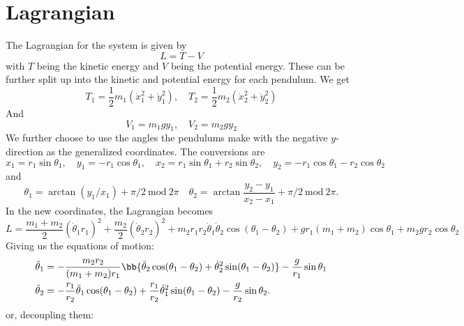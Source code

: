 \documentclass[a4paper,11pt]{article}
\begin{document}
	\section{Lagrangian}
	The Lagrangian for the system is given by
	\begin{equation}\label{key}
		L = T - V
	\end{equation}
	with $ T $ being the kinetic energy and $ V $ being the potential energy. These can be further split up into the kinetic and potential energy for each pendulum. We get
	\begin{equation}\label{key}
		T_1 = \frac{1}{2} m_1 (\dot{x}_1^2 + \dot{y}_1^2), \quad T_2 = \frac{1}{2} m_2 (\dot{x}_2^2 + \dot{y}_2^2)
	\end{equation}
	And
	\begin{equation}\label{key}
		V_1 = m_1 g y_1, \quad V_2 = m_2 g y_2
	\end{equation}
	We further choose to use the angles the pendulums make with the negative $ y $-direction as the generalized coordinates. The conversions are
	\begin{equation}\label{key}
		x_1 = r_1 \sin \theta_1, \quad y_1 = -r_1 \cos \theta_1, \quad x_2 = r_1 \sin \theta_1 + r_2 \sin \theta_2, \quad y_2 = -r_1 \cos \theta_1 - r_2 \cos \theta_2
	\end{equation}
	and
	\begin{equation}\label{key}
		\theta_1 = \arctan(y_1/x_1) + \pi/2\ \text{mod}\ 2\pi\quad  \theta_2 = \arctan\frac{y_2-y_1}{x_2-x_1} + \pi/2 \ \text{mod}\ 2\pi.
	\end{equation}
	In the new coordinates, the Lagrangian becomes
	\begin{equation}\label{key}
		L = \frac{m_1+m_2}{2}(\dot{\theta}_1 r_1)^2 + \frac{m_2}{2} (\dot{\theta}_2 r_2)^2 + m_2 r_1r_2\dot{\theta}_1\dot{\theta}_2 \cos(\theta_1-\theta_2) + gr_1(m_1+m_2) \cos\theta_1 + m_2gr_2 \cos\theta_2
	\end{equation}
	Giving us the equations of motion:
	\begin{align}
		\ddot{\theta}_1 &= -\frac{m_2 r_2}{(m_1+m_2)r_1} \bb{\ddot{\theta}_2 \cos(\theta_1-\theta_2) + \dot{\theta}_2^2 \sin(\theta_1-\theta_2)} - \frac{g}{r_1} \sin\theta_1\\
		\ddot{\theta}_2 &= -\frac{r_1}{r_2} \ddot{\theta}_1 \cos(\theta_1-\theta_2) + \frac{r_1}{r_2} \dot{\theta}_1^2 \sin(\theta_1-\theta_2) - \frac{g}{r_2} \sin\theta_2. 
	\end{align}
	or, decoupling them:
\end{document}
